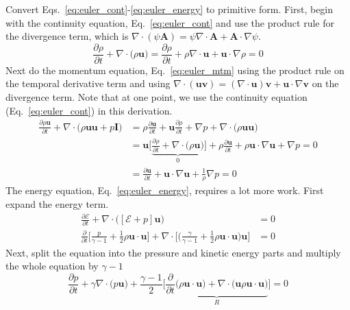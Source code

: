 \documentclass{report}
\begin{document}
Convert Eqs.~\ref{eq:euler_cont}-\ref{eq:euler_energy} to primitive form. First, begin with the continuity equation, Eq.~\ref{eq:euler_cont} and use the
product rule for the divergence term, which is $\nabla \cdot( \psi \mathbf{A} ) = \psi \nabla \cdot \mathbf{A}+ \mathbf{A}\cdot \nabla \psi$.
\begin{equation}
	\frac{\partial \rho}{\partial t} + \nabla \cdot \big( \rho \mathbf{u} \big) 
	= \frac{\partial \rho}{\partial t} + \rho \nabla \cdot \mathbf{u}+ \mathbf{u} \cdot \nabla \rho = 0
\end{equation}
Next do the momentum equation, Eq.~\ref{eq:euler_mtm} using the product rule on the temporal derivative term
and using $\nabla \cdot (\mathbf{u}\mathbf{v}) = (\nabla \cdot \mathbf{u})\mathbf{v} + \mathbf{u} \cdot \nabla \mathbf{v}$ on the divergence term.
Note that at one point, we use the continuity equation (Eq.~\ref{eq:euler_cont}) in this derivation.
\begin{align}
	\frac{\partial \rho \mathbf{u}}{\partial t} + \nabla \cdot \big(\rho \mathbf{u} \mathbf{u} + p \mathbf{I} \big) &=
	\rho \frac{\partial \mathbf{u}}{\partial t} + \mathbf{u}\frac{\partial \rho }{\partial t} + \nabla p + \nabla \cdot \big(\rho \mathbf{u} \mathbf{ u}\big) \\
	&= \mathbf{u} \Bigg[ \underbrace{\frac{\partial \rho}{\partial t} + \nabla \cdot \big(\rho \mathbf{u}\big) }_{0}\Bigg] + \rho \frac{\partial \mathbf{u}}{\partial t} + \rho \mathbf{u} \cdot \nabla \mathbf{u} + \nabla p = 0 \\
	&= \frac{\partial \mathbf{u}}{\partial t} + \mathbf{u} \cdot \nabla \mathbf{u}+ \frac{1}{\rho} \nabla p = 0
\end{align}
The energy equation, Eq.~\ref{eq:euler_energy}, requires a lot more work. First expand the energy term.
\begin{align}
	\frac{\partial \mathcal{E}}{\partial t} + \nabla \cdot \big( [ \mathcal{E} + p] \mathbf{u} \big)  &= 0 \\
	\frac{\partial }{\partial t} \Bigg[ \frac{p}{\gamma-1} + \frac{1}{2} \rho \mathbf{u} \cdot \mathbf{u} \Bigg]
	+ \nabla \cdot \Bigg[ \bigg( \frac{\gamma}{\gamma-1} + \frac{1}{2} \rho \mathbf{u}\cdot \mathbf{u} \bigg) \mathbf{u} \Bigg] &= 0
\end{align}
Next, split the equation into the pressure and kinetic energy parts and multiply the whole equation by $\gamma-1$
\begin{equation}
	 \frac{\partial p}{\partial t} + \gamma \nabla \cdot \big(p \mathbf{u} \big) 
	+ \frac{\gamma-1}{2} \Bigg[ \underbrace{\frac{\partial}{\partial t} \big(\rho \mathbf{u} \cdot \mathbf{u} \big) + \nabla \cdot \big( \mathbf{u} \rho \mathbf{u}\cdot \mathbf{u} \big)}_{R} \Bigg] = 0
\end{equation}
\end{document}
